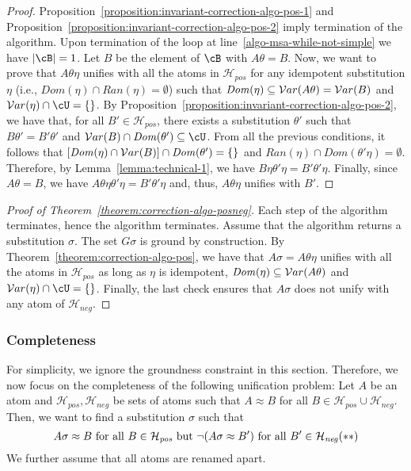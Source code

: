 \documentclass[fleqn]{tlp}
\newcommand{\Dom}{\mathit{Dom}}
\newcommand{\Ran}{\mathit{Ran}}
\newcommand{\Hpos}{\mathcal{H}_{\mathit{pos}}}
\newcommand{\Hneg}{\mathcal{H}_{\mathit{neg}}}
\begin{document}
\begin{appendix}
\begin{proof} 
  Proposition~\ref{proposition:invariant-correction-algo-pos-1}
  and Proposition~\ref{proposition:invariant-correction-algo-pos-2}
  imply termination of the algorithm.
Upon termination of the loop at line~\ref{algo-msa-while-not-simple}
  we have $|\cB|=1$.
Let $B$ be the element of $\cB$ with $A\theta=B$. 
Now, we want to prove that $A\theta\eta$ unifies with all the
  atoms in $\Hpos$ for any idempotent substitution $\eta$ (i.e.,
  $\Dom(\eta)\cap\Ran(\eta)=\emptyset$) such that
  $\Dom(\eta)\subseteq\Var(A\theta)=\Var(B)$
  and $\Var(\eta)\cap\cU=\emptyset$.
By Proposition~\ref{proposition:invariant-correction-algo-pos-2}, we
  have that, for all $B'\in\Hpos$, there exists a substitution
  $\theta'$ such that $B\theta'=B'\theta'$ and
  $\Var(B)\cap\Dom(\theta')\subseteq \cU$. 
From all the previous conditions, it follows that
  $[\Dom(\eta)\cap\Var(B)]\cap\Dom(\theta')=\emptyset$ and
  $\Ran(\eta)\cap\Dom(\theta'\eta)=\emptyset$. Therefore, by
  Lemma~\ref{lemma:technical-1}, we have
  $B\eta\theta'\eta=B'\theta'\eta$.  Finally, since
  $A\theta=B$, we have $A\theta\eta\theta'\eta=B'\theta'\eta$
  and, thus, $A\theta\eta$ unifies with $B'$.
\end{proof}

\begin{proof}[Proof of Theorem~\ref{theorem:correction-algo-posneg}]
  Each step of the algorithm terminates, hence the algorithm terminates.
  Assume that the algorithm returns a substitution $\sigma$.
  The set $G\sigma$ is ground by construction.
By Theorem~\ref{theorem:correction-algo-pos}, we have that $A\sigma
  = A\theta\eta$ unifies with all the atoms in $\Hpos$ as long as
  $\eta$ is idempotent, $\Dom(\eta)\subseteq\Var(A\theta)$ and
  $\Var(\eta)\cap\cU=\emptyset$. Finally, the last check ensures that
  $A\sigma$ does not unify with any atom of $\Hneg$.
\end{proof}

\subsubsection{Completeness} \label{sec:completeness}

For simplicity, we ignore the groundness constraint in this
section. Therefore, we now focus on the completeness of the following
unification problem: Let $A$ be an atom and $\Hpos,\Hneg$ be sets of
atoms such that $A\approx B$ for all $B\in\Hpos\cup\Hneg$. Then, we
want to find a substitution $\sigma$ such that
\[
A\sigma\approx B ~\mbox{for all}~B\in\Hpos 
~\mbox{but}~ \neg(A\sigma\approx B') ~\mbox{for all}~ B'\in\Hneg
\hfill(**)
\]
We further assume that all atoms are renamed apart. 


\end{appendix}
\end{document}
